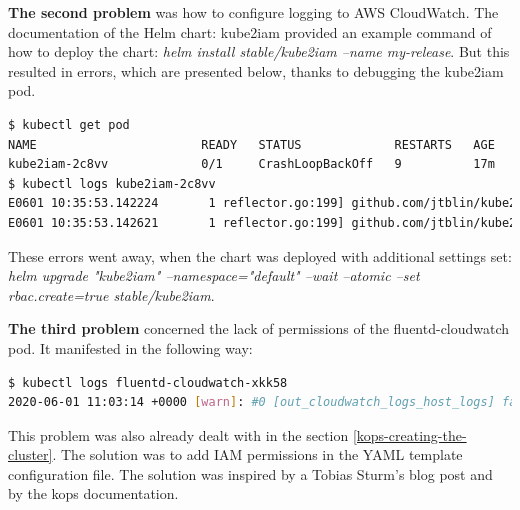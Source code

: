 \textbf{The second problem} was how to configure logging to AWS CloudWatch. The documentation of the Helm chart: kube2iam\cite{kube2iam} provided an example command of how to deploy the chart: \textit{helm install stable/kube2iam --name my-release}. But this resulted in errors, which are presented below, thanks to debugging the kube2iam pod.
\begin{lstlisting}[basicstyle=\tiny,caption={TODO},captionpos=b,language=Bash,xleftmargin=1cm]
$ kubectl get pod
NAME                       READY   STATUS             RESTARTS   AGE
kube2iam-2c8vv             0/1     CrashLoopBackOff   9          17m
$ kubectl logs kube2iam-2c8vv
E0601 10:35:53.142224       1 reflector.go:199] github.com/jtblin/kube2iam/vendor/k8s.io/client-go/tools/cache/reflector.go:94: Failed to list *v1.Pod: pods is forbidden: User "system:serviceaccount:default:default" cannot list resource "pods" in API group "" at the cluster scope
E0601 10:35:53.142621       1 reflector.go:199] github.com/jtblin/kube2iam/vendor/k8s.io/client-go/tools/cache/reflector.go:94: Failed to list *v1.Namespace: namespaces is forbidden: User "system:serviceaccount:default:default" cannot list resource "namespaces" in API group "" at the cluster scope
\end{lstlisting}

These errors went away, when the chart was deployed with additional settings set: \textit{helm upgrade "kube2iam" --namespace="default" --wait --atomic --set rbac.create=true stable/kube2iam}.

\textbf{The third problem} concerned the lack of permissions of the fluentd-cloudwatch pod. It manifested in the following way:
\begin{lstlisting}[basicstyle=\tiny,caption={TODO},captionpos=b,language=Bash,xleftmargin=1cm]
$ kubectl logs fluentd-cloudwatch-xkk58
2020-06-01 11:03:14 +0000 [warn]: #0 [out_cloudwatch_logs_host_logs] failed to flush the buffer. retry_time=8 next_retry_seconds=2020-06-01 11:05:22 +0000 chunk="5a703b5e45c9592f24399f9b73acaf43" error_class=Aws::CloudWatchLogs::Errors::AccessDeniedException error="User: arn:aws:sts::976184668068:assumed-role/nodes.testing.k8s-kops-for-masters-thesis.k8s.local/i-04a926040234f36d6 is not authorized to perform: logs:DescribeLogGroups on resource: arn:aws:logs:eu-west-1:976184668068:log-group::log-stream:"
\end{lstlisting}
This problem was also already dealt with in the section \ref{kops-creating-the-cluster}. The solution was to add IAM permissions in the YAML template configuration file. The solution was inspired by a Tobias Sturm's blog post\cite{kops-logs-cw-tobias} and by the kops documentation\cite{online-kops-iam}.

